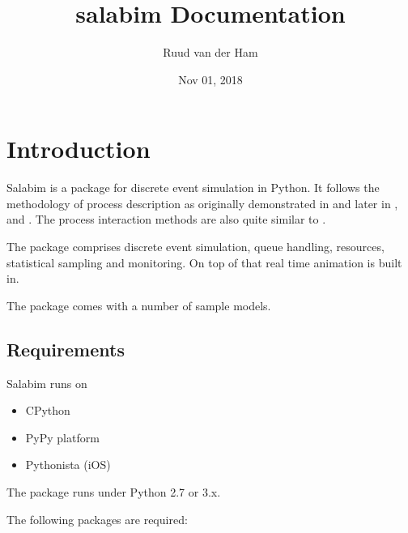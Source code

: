 \documentclass[letterpaper,10pt,english]{sphinxmanual}
\title{salabim Documentation}
\date{Nov 01, 2018}
\author{Ruud van der Ham}
\begin{document}
\maketitle
\sphinxtableofcontents
{}\label{\detokenize{index::doc}}



\chapter{Introduction}
\label{\detokenize{Introduction:introduction}}\label{\detokenize{Introduction::doc}}\label{\detokenize{Introduction:documentation-for-salabim}}
Salabim is a package for discrete event simulation in Python.
It follows the methodology of process description as originally demonstrated in 
and later in ,  and . 
The process interaction methods are also quite similar to .

The package comprises discrete event simulation, queue handling, resources, statistical sampling and monitoring.
On top of that real time animation is built in.

The package comes with a number of sample models.


\section{Requirements}
\label{\detokenize{Introduction:requirements}}
Salabim runs on
\begin{itemize}
\item {} 
CPython

\item {} 
PyPy platform

\item {} 
Pythonista (iOS)

\end{itemize}

The package runs under Python 2.7 or 3.x.

The following packages are required:
\end{document}
